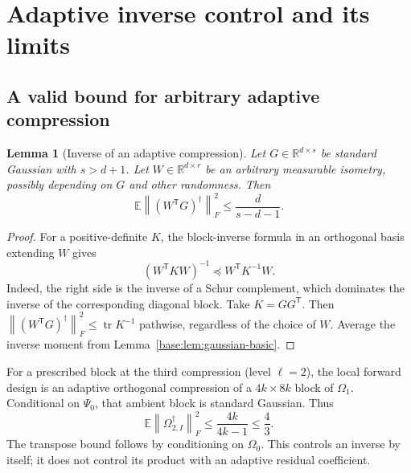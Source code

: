 \documentclass[11pt,oneside,openany,a4paper]{book}
\numberwithin{equation}{chapter}
\newtheorem{lemma}[theorem]{Lemma}
\theoremstyle{definition}
\theoremstyle{remark}
\newcommand{\R}{\mathbb R}\newcommand{\E}{\mathbb E}\newcommand{\Prb}{\mathbb P}\newcommand{\PP}{\mathbb P}
\newcommand{\T}{\mathsf T}\newcommand{\Id}{I}
\newcommand{\F}[1]{\left\lVert#1\right\rVert_F}
\DeclareMathOperator{\tr}{tr}\DeclareMathOperator{\rank}{rank}
\begin{document}
\section{Adaptive inverse control and its limits}\label{base:sec:inverse}
\subsection{A valid bound for arbitrary adaptive compression}
\begin{lemma}[Inverse of an adaptive compression]\label{base:lem:inverse-compression}
Let $G\in\R^{d\times s}$ be standard Gaussian with $s>d+1$.
Let $W\in\R^{d\times r}$ be an arbitrary measurable isometry, possibly
depending on $G$ and other randomness. Then
\begin{equation}\label{base:eq:inverse-compression}
 \E\F{(W^{\T}G)^\dagger}^2\le\frac{d}{s-d-1}.
\end{equation}
\end{lemma}
\begin{proof}
For a positive-definite $K$, the block-inverse formula in an orthogonal
basis extending $W$ gives
\[
 (W^{\T}KW)^{-1}\preceq W^{\T}K^{-1}W.
\]
Indeed, the right side is the inverse of a Schur complement, which dominates
the inverse of the corresponding diagonal block. Take $K=GG^{\T}$.
Then $\F{(W^{\T}G)^\dagger}^2\le\tr K^{-1}$ pathwise, regardless of the
choice of $W$. Average the inverse moment from
Lemma~\ref{base:lem:gaussian-basic}.\end{proof}

For a prescribed block at the third compression (level $\ell=2$), the
local forward design is an adaptive orthogonal compression of a
$4k\times8k$ block of $\Omega_1$. Conditional on $\Psi_0$, that ambient
block is standard Gaussian. Thus
\begin{equation}\label{base:eq:third-inverse}
 \E\F{\Omega_{2,I}^\dagger}^2
 \le\frac{4k}{4k-1}\le\frac43.
\end{equation}
The transpose bound follows by conditioning on $\Omega_0$.
This controls an inverse by itself; it does not control its product with
an adaptive residual coefficient.
\end{document}
